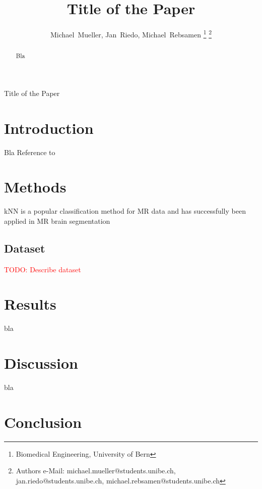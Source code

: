 \documentclass[journal]{IEEEtran}
\newcommand\TODO[1]{\textcolor{red}{TODO: #1}}
\begin{document}
\title{Title of the Paper}


\author{Michael~Mueller,
        Jan~Riedo,
        Michael~Rebsamen%
\thanks{Biomedical Engineering, University of Bern}%
\thanks{Authors e-Mail: michael.mueller@students.unibe.ch, jan.riedo@students.unibe.ch, michael.rebsamen@students.unibe.ch}}%
%
{Title of the Paper}
\maketitle

\begin{abstract}
Bla
\end{abstract}

\section{Introduction}
Bla
Reference to \cite{Criminisi2013}

\section{Methods}
kNN is a popular classification method for MR data and has successfully been applied in MR brain segmentation\cite{Anbeek2004,Cocosco2003,Warfield2000}
\subsection{Dataset}
\TODO{Describe dataset}



\section{Results}
bla
\section{Discussion}
bla

\section{Conclusion}




\end{document}
